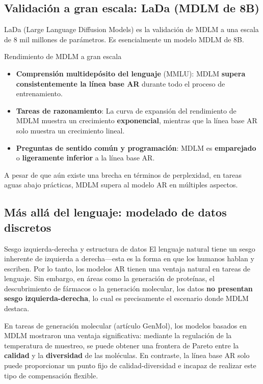 \subsection{Validación a gran escala: LaDa (MDLM de 8B)}

LaDa (Large Language Diffusion Models) es la validación de MDLM a una escala de 8 mil millones de parámetros. Es esencialmente un modelo MDLM de 8B.

\begin{importantbox}{Rendimiento de MDLM a gran escala}
\begin{itemize}
    \item \textbf{Comprensión multidepósito del lenguaje} (MMLU): MDLM \textbf{supera consistentemente la línea base AR} durante todo el proceso de entrenamiento.
    \item \textbf{Tareas de razonamiento}: La curva de expansión del rendimiento de MDLM muestra un crecimiento \textbf{exponencial}, mientras que la línea base AR solo muestra un crecimiento lineal.
    \item \textbf{Preguntas de sentido común y programación}: MDLM es \textbf{emparejado} o \textbf{ligeramente inferior} a la línea base AR.
\end{itemize}
A pesar de que aún existe una brecha en términos de perplexidad, en tareas aguas abajo prácticas, MDLM supera al modelo AR en múltiples aspectos.
\end{importantbox}

\subsection{Más allá del lenguaje: modelado de datos discretos}

\begin{knowledgebox}{Sesgo izquierda-derecha y estructura de datos}
El lenguaje natural tiene un sesgo inherente de izquierda a derecha—esta es la forma en que los humanos hablan y escriben. Por lo tanto, los modelos AR tienen una ventaja natural en tareas de lenguaje. Sin embargo, en áreas como la generación de proteínas, el descubrimiento de fármacos o la generación molecular, los datos \textbf{no presentan sesgo izquierda-derecha}, lo cual es precisamente el escenario donde MDLM destaca.
\end{knowledgebox}

En tareas de generación molecular (artículo GenMol), los modelos basados en MDLM mostraron una ventaja significativa: mediante la regulación de la temperatura de muestreo, se puede obtener una frontera de Pareto entre la \textbf{calidad} y la \textbf{diversidad} de las moléculas. En contraste, la línea base AR solo puede proporcionar un punto fijo de calidad-diversidad e incapaz de realizar este tipo de compensación flexible.


